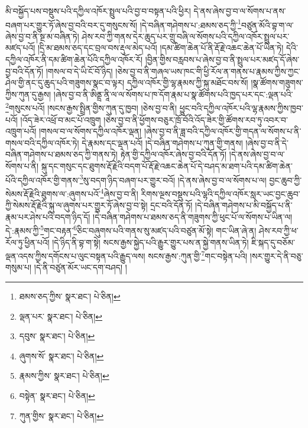 མི་བསྐྱོད་པས་བསྡུས་པའི་དཀྱིལ་འཁོར་སྤྲུལ་པའི་བྱ་བ་བསྟན་པའི་ཕྱིར། དེ་ནས་ཞེས་བྱ་བ་ལ་སོགས་པ་ནས་བཞག་པར་གྱུར་ཏོ་ཞེས་བྱ་བའི་བར་དུ་གསུངས་སོ། །དེ་བཞིན་གཤེགས་པ་:ཐམས་ཅད་ཀྱི་\footnote{ཐམས་ཅད་ཀྱིས་  སྣར་ཐང་།  པེ་ཅིན། }བཙུན་མོའི་བྷ་ག་ལ་ཞེས་བྱ་བ་ནི་སྔ་མ་བཞིན་ཏེ། ཤེས་རབ་ཀྱི་གནས་དེར་ཆུད་པར་གྲུ་བཞི་ལ་སོགས་པའི་དཀྱིལ་འཁོར་སྤྲུལ་པར་མཛད་པའོ། །དྲི་མ་ཐམས་ཅད་དང་བྲལ་བས་རྡུལ་མེད་པའོ། །དམ་ཚིག་ཆེན་པོ་ནི་རྡོ་རྗེ་འཆང་ཆེན་པོ་ཡིན་ཏེ། དེའི་དཀྱིལ་འཁོར་ནི་དམ་ཚིག་ཆེན་པོའི་དཀྱིལ་འཁོར་རོ། །བྱིན་གྱིས་བརླབས་པ་ཞེས་བྱ་བ་ནི་སྤྲུལ་པར་མཛད་དོ་ཞེས་བྱ་བའི་དོན་ཏོ། །གསལ་བ་དེ་ཡི་ངོ་བོ་ཉིད། །ཅེས་བྱ་བ་ནི་གཞལ་ཡས་ཁང་གི་ཕྱི་རོལ་ན་གནས་པ་རྣམས་ཀྱིས་ཀྱང་ཤེལ་གྱི་ནང་དུ་ཆུད་པའི་གཟུགས་སྣང་བ་ལྟར། དཀྱིལ་འཁོར་གྱི་ལྷ་རྣམས་ཀྱི་སྐུ་མཐོང་བས་སོ། །སྣ་ཚོགས་གཟུགས་ཀྱིས་ཀུན་དུ་རྒྱས། །ཞེས་བྱ་བ་ནི་ཨིནྡྲ་ནཱི་ལ་ལ་སོགས་པ་ཁ་དོག་རྣམ་པ་སྣ་ཚོགས་པའི་ཁྱད་པར་དང་:ལྡན་པའི་\footnote{ལྡན་པར་  སྣར་ཐང་།  པེ་ཅིན། }གསུངས་པའོ། །སངས་རྒྱས་སྤྲིན་གྱིས་ཀུན་དུ་ཁྱབ། །ཅེས་བྱ་བ་ནི། ཕྱུང་བའི་དཀྱིལ་འཁོར་པའི་ལྷ་རྣམས་ཀྱིས་ཁྱབ་པའོ། །འོད་ཟེར་འཕྲོ་བ་མང་པོ་འཁྲུག །ཅེས་བྱ་བ་ནི་ཕྱོགས་བཅུར་ཁྲོ་བོའི་འོད་ཟེར་གྱི་ཚོགས་རབ་ཏུ་འབར་བ་འཁྲུག་པའོ། །གསལ་བ་ལ་སོགས་དཀྱིལ་འཁོར་ལྡན། །ཞེས་བྱ་བ་ནི་ཟླ་བའི་དཀྱིལ་འཁོར་གྱི་གདན་ལ་སོགས་པ་ནི་གསལ་བའི་དཀྱིལ་འཁོར་ཏེ། དེ་རྣམས་དང་ལྡན་པའོ། །དེ་བཞིན་གཤེགས་པ་ཀུན་གྱི་གནས། །ཞེས་བྱ་བ་ནི་དེ་བཞིན་གཤེགས་པ་ཐམས་ཅད་ཀྱི་གནས་ཏེ། རྟེན་གྱི་དཀྱིལ་འཁོར་ཞེས་བྱ་བའི་དོན་ཏོ། །དེ་ནས་ཞེས་བྱ་བ་ལ་སོགས་པ་ནི། སྐུ་དང་གསུང་དང་ཐུགས་རྡོ་རྗེའི་བདག་པོ་རྡོ་རྗེ་འཆང་ཆེན་པོ་དེ་བཤད་མ་ཐག་པའི་དམ་ཚིག་ཆེན་པོའི་དཀྱིལ་འཁོར་གྱི་གནས་\footnote{དབུས་  སྣར་ཐང་།  པེ་ཅིན། }སུ་བདག་ཉིད་བཞག་པར་གྱུར་བའོ། །དེ་ནས་ཞེས་བྱ་བ་ལ་སོགས་པ་ལ། བྱང་ཆུབ་ཀྱི་སེམས་རྡོ་རྗེའི་ཐུགས་ལ་:ཞུགས་པའོ་\footnote{ཞུགས་སོ་  སྣར་ཐང་།  པེ་ཅིན། }ཞེས་བྱ་བ་ནི། རིགས་ལྔས་བསྡུས་པའི་ལྷའི་དཀྱིལ་འཁོར་སླར་ཡང་བྱང་ཆུབ་ཀྱི་སེམས་རྡོ་རྗེའི་སྐུ་ལ་ཞུགས་པར་གྱུར་ཏོ་ཞེས་བྱ་བ་སྟེ། དྲང་བའི་དོན་ཏོ། །དེ་བཞིན་གཤེགས་པ་མི་བསྐྱོད་པ་ནི་རྣམ་པར་ཤེས་པའི་བདག་ཉིད་དོ། །དེ་བཞིན་གཤེགས་པ་ཐམས་ཅད་ནི་གཟུགས་ཀྱི་ཕུང་པོ་ལ་སོགས་པ་ཡིན་ལ། དེ་:རྣམས་ཀྱི་\footnote{རྣམས་ཀྱིས་  སྣར་ཐང་།  པེ་ཅིན། }གང་བརྟན་\footnote{བསྟེན་  སྣར་ཐང་།  པེ་ཅིན། }ཅིང་བཞུགས་པའི་གནས་སུ་མཛད་པའི་བཙུན་མོ་སྟེ། གང་ཡིན་ཞེ་ན། ཤེས་རབ་ཀྱི་ཕ་རོལ་ཏུ་ཕྱིན་པའོ། །དེ་ཉིད་ནི་བྷ་ག་སྟེ། སངས་རྒྱས་སྐྱེད་པའི་རྒྱུར་གྱུར་པས་ན་སྐྱེ་གནས་ཡིན་ཏེ། ཇི་སྐད་དུ་བཅོམ་ལྡན་འདས་ཀྱིས་དགོངས་པ་ལུང་བསྟན་པའི་རྒྱུད་ལས། སངས་རྒྱས་:ཀུན་གྱི་\footnote{ཀུན་གྱིས་  སྣར་ཐང་།  པེ་ཅིན། }གང་བསྟེན་པའི། །སར་གྱུར་དེ་ནི་བཅུ་གསུམ་པ། །དེ་ནི་བཙུན་མོར་ཡང་དག་བཤད། །
